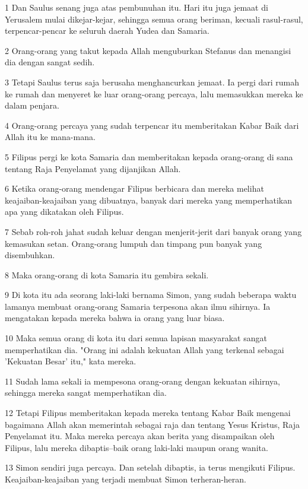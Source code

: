 \par 1 Dan Saulus senang juga atas pembunuhan itu. Hari itu juga jemaat di Yerusalem mulai dikejar-kejar, sehingga semua orang beriman, kecuali rasul-rasul, terpencar-pencar ke seluruh daerah Yudea dan Samaria.
\par 2 Orang-orang yang takut kepada Allah menguburkan Stefanus dan menangisi dia dengan sangat sedih.
\par 3 Tetapi Saulus terus saja berusaha menghancurkan jemaat. Ia pergi dari rumah ke rumah dan menyeret ke luar orang-orang percaya, lalu memasukkan mereka ke dalam penjara.
\par 4 Orang-orang percaya yang sudah terpencar itu memberitakan Kabar Baik dari Allah itu ke mana-mana.
\par 5 Filipus pergi ke kota Samaria dan memberitakan kepada orang-orang di sana tentang Raja Penyelamat yang dijanjikan Allah.
\par 6 Ketika orang-orang mendengar Filipus berbicara dan mereka melihat keajaiban-keajaiban yang dibuatnya, banyak dari mereka yang memperhatikan apa yang dikatakan oleh Filipus.
\par 7 Sebab roh-roh jahat sudah keluar dengan menjerit-jerit dari banyak orang yang kemasukan setan. Orang-orang lumpuh dan timpang pun banyak yang disembuhkan.
\par 8 Maka orang-orang di kota Samaria itu gembira sekali.
\par 9 Di kota itu ada seorang laki-laki bernama Simon, yang sudah beberapa waktu lamanya membuat orang-orang Samaria terpesona akan ilmu sihirnya. Ia mengatakan kepada mereka bahwa ia orang yang luar biasa.
\par 10 Maka semua orang di kota itu dari semua lapisan masyarakat sangat memperhatikan dia. "Orang ini adalah kekuatan Allah yang terkenal sebagai 'Kekuatan Besar' itu," kata mereka.
\par 11 Sudah lama sekali ia mempesona orang-orang dengan kekuatan sihirnya, sehingga mereka sangat memperhatikan dia.
\par 12 Tetapi Filipus memberitakan kepada mereka tentang Kabar Baik mengenai bagaimana Allah akan memerintah sebagai raja dan tentang Yesus Kristus, Raja Penyelamat itu. Maka mereka percaya akan berita yang disampaikan oleh Filipus, lalu mereka dibaptis--baik orang laki-laki maupun orang wanita.
\par 13 Simon sendiri juga percaya. Dan setelah dibaptis, ia terus mengikuti Filipus. Keajaiban-keajaiban yang terjadi membuat Simon terheran-heran.
